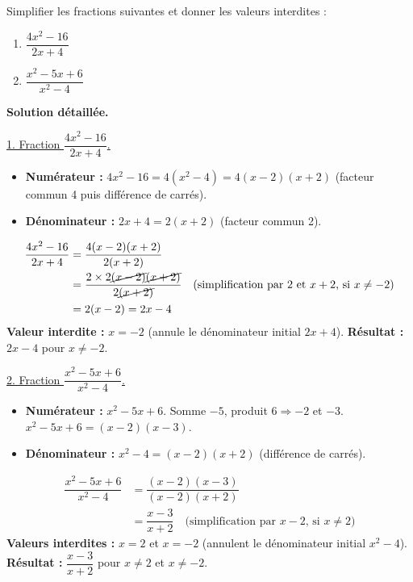 \documentclass[11pt]{article}
\begin{document}
\begin{exoresolu}
Simplifier les fractions suivantes et donner les valeurs interdites :
\begin{enumerate}
    \item $\dfrac{4x^2 - 16}{2x + 4}$
    \item $\dfrac{x^2 - 5x + 6}{x^2 - 4}$
\end{enumerate}
\tcblower
\textbf{Solution détaillée.}

\underline{1. Fraction $\dfrac{4x^2 - 16}{2x + 4}$.}
\begin{itemize}
    \item \textbf{Numérateur :} $4x^2 - 16 = 4(x^2 - 4) = 4(x-2)(x+2)$ (facteur commun 4 puis différence de carrés).
    \item \textbf{Dénominateur :} $2x + 4 = 2(x+2)$ (facteur commun 2).
\end{itemize}
\begin{align*}
\dfrac{4x^2 - 16}{2x + 4} &= \dfrac{4(x-2)(x+2)}{2(x+2)} \\
&= \dfrac{2 \times 2 \cancel{(x-2)} \cancel{(x+2)}}{2 \cancel{(x+2)}} \quad \text{(simplification par $2$ et $x+2$, si $x \neq -2$)} \\
&= 2(x-2) = 2x - 4
\end{align*}
\textbf{Valeur interdite :} $x = -2$ (annule le dénominateur initial $2x+4$).
\textbf{Résultat :} $2x - 4$ pour $x \neq -2$.

\underline{2. Fraction $\dfrac{x^2 - 5x + 6}{x^2 - 4}$.}
\begin{itemize}
    \item \textbf{Numérateur :} $x^2 - 5x + 6$. Somme $-5$, produit $6 \Rightarrow -2$ et $-3$.
    $x^2 - 5x + 6 = (x-2)(x-3)$.
    \item \textbf{Dénominateur :} $x^2 - 4 = (x-2)(x+2)$ (différence de carrés).
\end{itemize}
\begin{align*}
\dfrac{x^2 - 5x + 6}{x^2 - 4} &= \dfrac{(x-2)(x-3)}{(x-2)(x+2)} \\
&= \dfrac{x-3}{x+2} \quad \text{(simplification par $x-2$, si $x \neq 2$)}
\end{align*}
\textbf{Valeurs interdites :} $x = 2$ et $x = -2$ (annulent le dénominateur initial $x^2-4$).
\textbf{Résultat :} $\dfrac{x-3}{x+2}$ pour $x \neq 2$ et $x \neq -2$.
\end{exoresolu}
\end{document}
